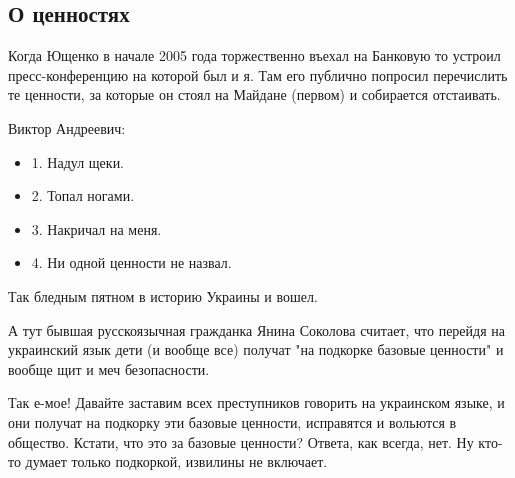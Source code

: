  
 
 

\subsection{О ценностях}
\label{sec:10_11_2020.fb.denis_zharkih.1.cennosti}

Когда Ющенко в начале 2005 года торжественно въехал на Банковую то устроил
пресс-конференцию на которой был и я. Там его публично попросил перечислить те
ценности, за которые он стоял на Майдане (первом) и собирается отстаивать.

Виктор Андреевич:

\begin{itemize}
\item 1. Надул щеки.
\item 2. Топал ногами.
\item 3. Накричал на меня.
\item 4. Ни одной ценности не назвал. 
\end{itemize}

Так бледным пятном в историю Украины и вошел. 

А тут бывшая русскоязычная гражданка Янина Соколова считает, что перейдя на
украинский язык дети (и вообще все) получат "на подкорке базовые ценности" и
вообще щит и меч безопасности. 

Так е-мое! Давайте заставим всех преступников говорить на украинском языке, и
они получат на подкорку эти базовые ценности, исправятся и вольются в общество.
Кстати, что это за базовые ценности? Ответа, как всегда, нет. Ну кто-то думает
только подкоркой, извилины не включает.
